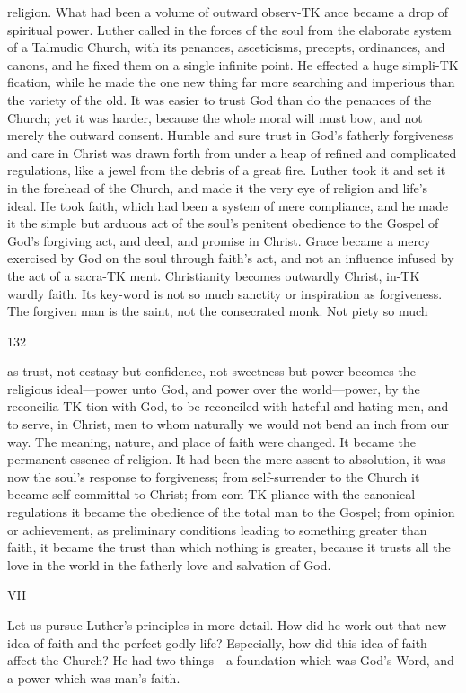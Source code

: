 \documentclass[12pt,a5paper,oneside]{book}
\begin{document}
religion. What had been a volume of outward observ-TK
ance became a drop of spiritual power. Luther called 
in the forces of the soul from the elaborate system of 
a Talmudic Church, with its penances, asceticisms, 
precepts, ordinances, and canons, and he fixed them 
on a single infinite point. He effected a huge simpli-TK
fication, while he made the one new thing far more 
searching and imperious than the variety of the old. 
It was easier to trust God than do the penances of the 
Church; yet it was harder, because the whole moral 
will must bow, and not merely the outward consent. 
Humble and sure trust in God's fatherly forgiveness 
and care in Christ was drawn forth from under a heap 
of refined and complicated regulations, like a jewel 
from the debris of a great fire. Luther took it and 
set it in the forehead of the Church, and made it the 
very eye of religion and life's ideal. He took faith, 
which had been a system of mere compliance, and 
he made it the simple but arduous act of the soul's 
penitent obedience to the Gospel of God's forgiving 
act, and deed, and promise in Christ. Grace became 
a mercy exercised by God on the soul through faith's 
act, and not an influence infused by the act of a sacra-TK
ment. Christianity becomes outwardly Christ, in-TK
wardly faith. Its key-word is not so much sanctity or 
inspiration as forgiveness. The forgiven man is the 
saint, not the consecrated monk. Not piety so much 



132 

as trust, not ecstasy but confidence, not sweetness but 
power becomes the religious ideal---power unto God, 
and power over the world---power, by the reconcilia-TK
tion with God, to be reconciled with hateful and hating 
men, and to serve, in Christ, men to whom naturally 
we would not bend an inch from our way. The 
meaning, nature, and place of faith were changed. It 
became the permanent essence of religion. It had been 
the mere assent to absolution, it was now the soul's 
response to forgiveness; from self-surrender to the 
Church it became self-committal to Christ; from com-TK
pliance with the canonical regulations it became the 
obedience of the total man to the Gospel; from opinion 
or achievement, as preliminary conditions leading to 
something greater than faith, it became the trust than 
which nothing is greater, because it trusts all the love 
in the world in the fatherly love and salvation of God. 

VII 

Let us pursue Luther's principles in more detail. 
How did he work out that new idea of faith and the 
perfect godly life? Especially, how did this idea 
of faith affect the Church? He had two things---a 
foundation which was God's Word, and a power 
which was man's faith. 
\end{document}
